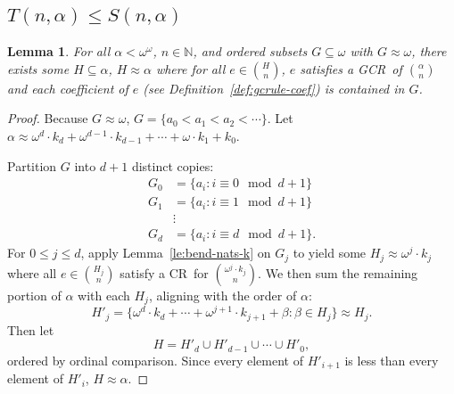 \documentclass[10pt,a4paper]{article}
\newcommand{\om}{\omega}
\newcommand{\oequiv}{\approx}
\newcommand{\N}{\mathbb{N}}
\newcommand{\crulenospace}{CR}
\newcommand{\crule}{\crulenospace~}
\newcommand{\gencrulenospace}{GCR}
\newcommand{\gencrule}{\gencrulenospace~}
\newcommand{\numpoints}{n}
\newcommand{\idegr}{j}
\newcommand{\commonconst}{a}
\theoremstyle{plain}
\newtheorem{lemma}[theorem]{Lemma}
\theoremstyle{definition}
\begin{document}
\subsection{\texorpdfstring{$T(\numpoints,\alpha)\leq S(\numpoints,\alpha)$}{T(\numpoints, alpha) <= S(\numpoints, alpha)}}
\begin{lemma}
\label{le:bend-nats-alph}
For all $\alpha < \om^\om$, $\numpoints \in \N$, and ordered subsets
$G \subseteq \om$ with $G \oequiv \om$, there exists some $H \subseteq \alpha$, $H \oequiv \alpha$ where for all $e \in \binom{H}{\numpoints}$, $e$ satisfies a \gencrule of $\binom{\alpha}{\numpoints}$ and each coefficient of $e$ (see Definition~\ref{def:gcrule-coef}) is contained in $G$.
\end{lemma}
\begin{proof}
Because $G \oequiv \om$, $G = \{\commonconst_0 < \commonconst_1 < \commonconst_2 <
\cdots\}$.
Let $\alpha \oequiv \om^d \cdot k_d + \om^{d-1} \cdot k_{d-1} + \cdots + \om \cdot k_1 + k_0$.

Partition $G$ into $d+1$ distinct copies: \begin{align*}
    G_0 &= \{a_i : i \equiv 0 \mod d+1\}\\
    G_1 &= \{a_i : i \equiv 1 \mod d+1\}\\
    &\vdots\\
    G_{d} &= \{a_i : i \equiv d \mod d+1\}.
\end{align*}
For $0 \leq \idegr \leq d$, apply Lemma~\ref{le:bend-nats-k} on $G_\idegr$ to yield some $H_\idegr \oequiv \om^{\idegr} \cdot k_{\idegr}$ where all $e \in \binom{H_{\idegr}}{n}$ satisfy a \crule for $\binom{\om^{\idegr} \cdot k_{\idegr}}{\numpoints}$.
We then sum the remaining portion of $\alpha$ with each $H_j$, aligning with the order of $\alpha$:
$$
H'_j = \{\om^d \cdot k_d + \cdots + \om^{j+1} \cdot k_{j+1} + \beta : \beta \in H_j\} \oequiv H_j.
$$
Then let
$$H = H'_d \cup H'_{d-1} \cup \cdots \cup H'_0,$$
ordered by ordinal comparison. Since every element of $H'_{i+1}$ is less than every element of $H'_i$, $H \oequiv \alpha$.




\end{proof}
\end{document}
